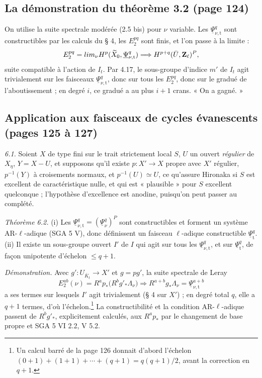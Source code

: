 \documentclass[11pt,a4paper]{article}
\begin{document}
\subsection*{La démonstration du théorème 3.2 (page 124)}

On utilise la suite spectrale modérée (2.5 bis) pour $\nu$ variable. Les
$\underline\Psi^q_{\nu,\mathrm{t}}$ sont constructibles par les calculs du § 4,
les $E_2^{pq}$ sont finis, et l'on passe à la limite :
\[
  E_2^{pq} = \varprojlim_\nu H^p(\widetilde X_0, \underline\Psi^q_{\nu,\mathrm{t}})
  \Longrightarrow H^{p+q}(\bar U, \mathbf{Z}_\ell)^P ,
\]
suite compatible à l'action de $I_t$. Par 4.17, le sous-groupe d'indice $m'$
de $I_t$ agit trivialement sur les faisceaux $\underline\Psi^q_{\nu,\mathrm{t}}$,
donc sur tous les $E_2^{pq}$, donc sur le gradué de l'aboutissement ; en degré
$i$, ce gradué a au plus $i+1$ crans. « On a gagné. »

\subsection*{Application aux faisceaux de cycles évanescents (pages 125 à 127)}

\emph{6.1.} Soient $X$ de type fini sur le trait strictement local $S$, $U$ un
ouvert \emph{régulier} de $X_\eta$, $Y = X - U$, et supposons qu'il existe
$p : X' \to X$ propre avec $X'$ régulier, $p^{-1}(Y)$ à croisements normaux, et
$p^{-1}(U) \simeq U$, ce qu'assure Hironaka si $S$ est excellent de
caractéristique nulle, et qui est « plausible » pour $S$ excellent quelconque ;
l'hypothèse d'excellence est anodine, puisqu'on peut passer au complété.

\emph{Théorème 6.2.} (i) Les $\underline\Psi^q_{\nu,\mathrm{t}} =
(\underline\Psi^q_\nu)^P$ sont constructibles et forment un système AR-$\ell$-adique
(SGA 5 V), donc définissent un faisceau $\ell$-adique constructible
$\underline\Psi^q_{\mathrm{t}}$. (ii) Il existe un sous-groupe ouvert $I'$ de $I$
qui agit sur tous les $\underline\Psi^q_{\nu,\mathrm{t}}$, et sur
$\underline\Psi^q_{\mathrm{t}}$, de façon unipotente d'échelon $\leq q + 1$.

\emph{Démonstration.} Avec $g' : U_{\overline K_t} \to X'$ et $g = p g'$, la suite
spectrale de Leray
\[
  E_2^{ab}(\nu) = R^a p_*\bigl(R^b g'_*\Lambda_\nu\bigr) \Longrightarrow
  R^{a+b} g_*\Lambda_\nu = \underline\Psi^{a+b}_{\nu,\mathrm{t}}
\]
a ses termes sur lesquels $I'$ agit trivialement (§ 4 sur $X'$) ; en degré total
$q$, elle a $q+1$ termes, d'où l'échelon.\footnote{Un calcul barré de la page
126 donnait d'abord l'échelon $(0+1) + (1+1) + \cdots + (q+1) = q(q+1)/2$, avant
la correction en $q+1$.} La constructibilité et la condition AR-$\ell$-adique
passent de $R^b g'_*$, explicitement calculés, aux $R^a p_*$ par le changement de
base propre et SGA 5 VI 2.2, V 5.2.
\end{document}
